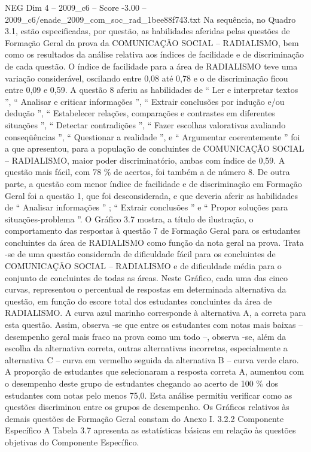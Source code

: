 \begin{textsample}{NEG Dim 4 – 2009\_c6 – Score -3.00 – 2009\_c6/enade\_2009\_com\_soc\_rad\_1bee88f743.txt}
Na sequência, no Quadro 3.1, estão especificadas, por questão, as habilidades aferidas pelas questões de Formação Geral da prova da COMUNICAÇÃO SOCIAL – RADIALISMO, bem como os resultados da análise relativa aos índices de facilidade e de discriminação de cada questão.
O índice de facilidade para a área de RADIALISMO teve uma variação considerável, oscilando entre 0,08 até 0,78 e o de discriminação ficou entre 0,09 e 0,59.
A questão 8 aferiu as habilidades de “ Ler e interpretar textos ”, “ Analisar e criticar informações ”, “ Extrair conclusões por indução e/ou dedução ”, “ Estabelecer relações, comparações e contrastes em diferentes situações ”, “ Detectar contradições ”, “ Fazer escolhas valorativas avaliando conseqüências ”, “ Questionar a realidade ”, e “ Argumentar coerentemente ” foi a que apresentou, para a população de concluintes de COMUNICAÇÃO SOCIAL – RADIALISMO, maior poder discriminatório, ambas com índice de 0,59.
A questão mais fácil, com 78 \% de acertos, foi também a de número 8.
De outra parte, a questão com menor índice de facilidade e de discriminação em Formação Geral foi a questão 1, que foi desconsiderada, e que deveria aferir as habilidades de “ Analisar informações ” ; “ Extrair conclusões ” e “ Propor soluções para situações-problema ”.
O Gráfico 3.7 mostra, a título de ilustração, o comportamento das respostas à questão 7 de Formação Geral para os estudantes concluintes da área de RADIALISMO como função da nota geral na prova.
Trata -se de uma questão considerada de dificuldade fácil para os concluintes de COMUNICAÇÃO SOCIAL – RADIALISMO e de dificuldade média para o conjunto de concluintes de todas as áreas.
Neste Gráfico, cada uma das cinco curvas, representou o percentual de respostas em determinada alternativa da questão, em função do escore total dos estudantes concluintes da área de RADIALISMO.
A curva azul marinho corresponde à alternativa A, a correta para esta questão.
Assim, observa -se que entre os estudantes com notas mais baixas – desempenho geral mais fraco na prova como um todo –, observa -se, além da escolha da alternativa correta, outras alternativas incorretas, especialmente a alternativa C – curva em vermelho seguida da alternativa B – curva verde claro.
A proporção de estudantes que selecionaram a resposta correta A, aumentou com o desempenho deste grupo de estudantes chegando ao acerto de 100 \% dos estudantes com notas pelo menos 75,0.
Esta análise permitiu verificar como as questões discriminou entre os grupos de desempenho.
Os Gráficos relativos às demais questões de Formação Geral constam do Anexo I. 3.2.2 Componente Específico A Tabela 3.7 apresenta as estatísticas básicas em relação às questões objetivas do Componente Específico.

\end{textsample}
